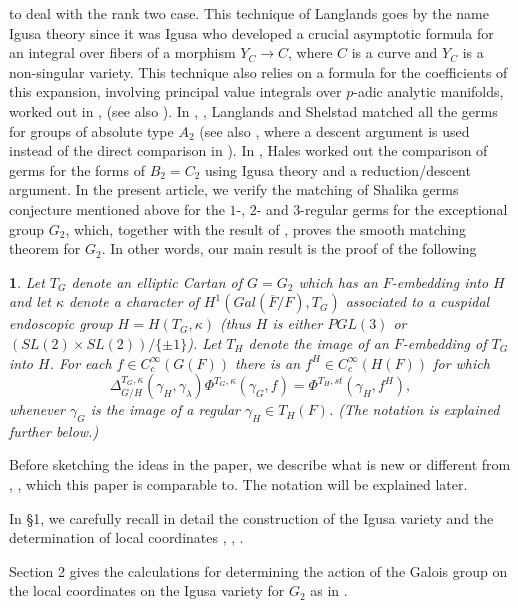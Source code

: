 \documentclass[12pt,letterpaper]{amsart}
\newcommand{\ovF}{\overline{F}}
\newcommand{\proclaimname}{}
\newtheorem*{proclaimx}{\proclaimname}
\newenvironment{proclaim}[1]%
  {\renewcommand{\proclaimname}{#1}\begin{proclaimx}}{\end{proclaimx}}
\begin{document}
to deal with the rank two case. This technique of Langlands goes by
the name Igusa theory since it was Igusa \cite{Ig78} who developed a crucial
asymptotic formula for an integral over fibers of a morphism
$Y_C\rightarrow C$, where $C$ is a curve and $Y_C$ is a non-singular
variety. This technique also relies on a formula for the coefficients
of this expansion, involving principal value integrals over $p$-adic
analytic manifolds, worked out in \cite{Ig78}, \cite{La83} (see also
\cite{LS83}). In \cite{La83}, \cite{LS89}, Langlands and Shelstad
matched all the germs for groups of absolute type $A_2$
(see also \cite{Ha92b}, where a descent argument is used instead of
the direct comparison in \cite{LS89}).
In \cite{Ha89}, Hales worked out the comparison of germs for the forms of
$B_2=C_2$ using Igusa theory and a reduction/descent argument.
In the present article, we verify the matching of Shalika germs conjecture
mentioned above for the $1$-, $2$- and $3$-regular germs for the
exceptional group $G_2$,
which, together with the result of \cite{She89}, proves the smooth
matching theorem for $G_2$. In other words, our main result
is the proof of the following

\begin{proclaim}{Smooth Matching Conjecture for $G_2$}
Let $T_G$ denote an elliptic Cartan of $G=G_2$
which has an $F$-embedding into $H$ and let $\kappa$ denote
a character of $H^1(Gal(\ovF/F),T_G)$ associated to a
cuspidal endoscopic group $H=H(T_G,\kappa)$
\cite{La83} (thus $H$ is either $PGL(3)$ or $(SL(2)\times SL(2))/\{\pm 1\}$).
Let $T_H$ denote the image of an $F$-embedding of $T_G$ into $H$.
For each $f\in C_c^\infty(G(F))$ there is an $f^H\in C_c^\infty(H(F))$
for which
\[
\Delta_{G/H}^{T_G,\kappa}(\gamma_H,\gamma_\lambda)
\Phi^{T_G,\kappa}(\gamma_G,f)
=\Phi^{T_H,st}(\gamma_H,f^H),
\]
whenever $\gamma_G$ is the image of a regular $\gamma_H\in T_H(F)$.
(The notation is explained further below.)
\end{proclaim}

\medskip
Before sketching the ideas in the paper, we describe what is new
or different from \cite{Ha89}, \cite{Ha92b}, which this paper
is comparable to. The notation will be explained later.

In \S 1, we carefully recall
in detail the construction of the Igusa variety and the
determination of local coordinates \cite{La83}, \cite{Ha92a}, \cite{Ha89}.

Section 2 gives the calculations for determining the action of the Galois
group on the local coordinates on the
Igusa variety for $G_2$ as in \cite{Ha89}.
\end{document}
